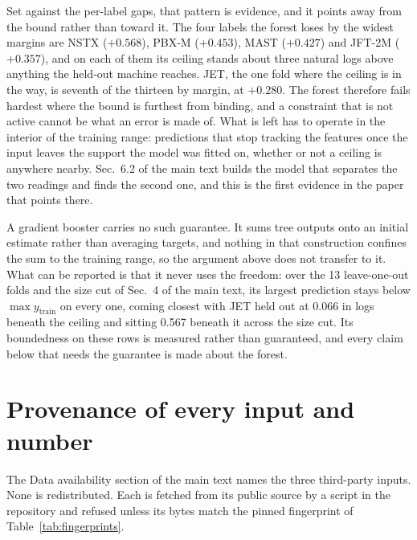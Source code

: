 \documentclass[12pt,letterpaper]{article}
\begin{document}
Set against the per-label gaps, that pattern is evidence, and it points away
from the bound rather than toward it. The four labels the forest loses by the
widest margins are NSTX ($+0.568$), PBX-M ($+0.453$), MAST ($+0.427$) and
JFT-2M ($+0.357$), and on each of them its ceiling stands about three natural
logs above anything the held-out machine reaches. JET, the one fold where the
ceiling is in the way, is seventh of the thirteen by margin, at $+0.280$. The
forest therefore fails hardest where the bound is furthest from binding, and a
constraint that is not active cannot be what an error is made of. What is left
has to operate in the interior of the training range: predictions that stop
tracking the features once the input leaves the support the model was fitted on,
whether or not a ceiling is anywhere nearby. Sec.~6.2 of the main text builds the
model that separates the two readings and finds the second one, and this is the
first evidence in the paper that points there.

A gradient booster carries no such guarantee. It sums tree outputs onto an
initial estimate rather than averaging targets, and nothing in that
construction confines the sum to the training range, so the argument above does
not transfer to it. What can be reported is that it never uses the freedom: over
the 13 leave-one-out folds and the size cut of Sec.~4 of the main text, its largest
prediction stays below $\max y_{\text{train}}$ on every one, coming closest with
JET held out at 0.066 in logs beneath the ceiling and sitting 0.567 beneath it
across the size cut. Its boundedness on these rows is measured rather than
guaranteed, and every claim below that needs the guarantee is made about the
forest.

\section{Provenance of every input and number}
\label{supp:provenance}

The Data availability section of the main text names the three third-party
inputs. None is redistributed. Each is fetched from its public source by a
script in the repository and refused unless its bytes match the pinned
fingerprint of Table~\ref{tab:fingerprints}.
\end{document}
